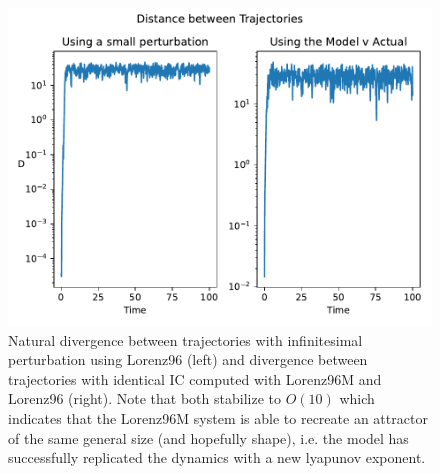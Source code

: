 \documentclass{article}
\begin{document}
\begin{enumerate}[label = \alph*).]
    \begin{figure}[ht]
        \centering
        \includegraphics[width=\textwidth]{traj_div.pdf}
        \caption{Natural divergence between trajectories with infinitesimal
        perturbation using Lorenz96 (left) and divergence between trajectories
        with identical IC computed with
        Lorenz96M and Lorenz96 (right). Note that both stabilize to $O(10)$
        which indicates that the Lorenz96M system is able to recreate an attractor of the
        same general size (and hopefully shape), i.e. the model has successfully
        replicated the dynamics with a new lyapunov exponent.}
        \label{fig:attractor_size}
    \end{figure}


\end{enumerate}
\end{document}
